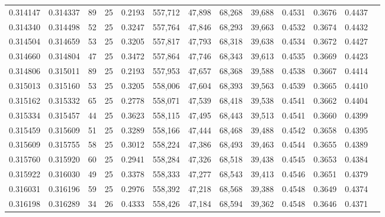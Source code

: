 \begin{tabular}{rrrrrrrrrrrrr}
0.314147 & 0.314337 &    89 &  25 &                                     0.2193 & 557,712 &  47,898 &  68,268 &  39,688 & 0.4531 & 0.3676 & 0.4437 \\
0.314340 & 0.314498 &    52 &  25 &                                     0.3247 & 557,764 &  47,846 &  68,293 &  39,663 & 0.4532 & 0.3674 & 0.4432 \\
0.314504 & 0.314659 &    53 &  25 &                                     0.3205 & 557,817 &  47,793 &  68,318 &  39,638 & 0.4534 & 0.3672 & 0.4427 \\
0.314660 & 0.314804 &    47 &  25 &                                     0.3472 & 557,864 &  47,746 &  68,343 &  39,613 & 0.4535 & 0.3669 & 0.4423 \\
0.314806 & 0.315011 &    89 &  25 &                                     0.2193 & 557,953 &  47,657 &  68,368 &  39,588 & 0.4538 & 0.3667 & 0.4414 \\
0.315013 & 0.315160 &    53 &  25 &                                     0.3205 & 558,006 &  47,604 &  68,393 &  39,563 & 0.4539 & 0.3665 & 0.4410 \\
0.315162 & 0.315332 &    65 &  25 &                                     0.2778 & 558,071 &  47,539 &  68,418 &  39,538 & 0.4541 & 0.3662 & 0.4404 \\
0.315334 & 0.315457 &    44 &  25 &                                     0.3623 & 558,115 &  47,495 &  68,443 &  39,513 & 0.4541 & 0.3660 & 0.4399 \\
0.315459 & 0.315609 &    51 &  25 &                                     0.3289 & 558,166 &  47,444 &  68,468 &  39,488 & 0.4542 & 0.3658 & 0.4395 \\
0.315609 & 0.315755 &    58 &  25 &                                     0.3012 & 558,224 &  47,386 &  68,493 &  39,463 & 0.4544 & 0.3655 & 0.4389 \\
0.315760 & 0.315920 &    60 &  25 &                                     0.2941 & 558,284 &  47,326 &  68,518 &  39,438 & 0.4545 & 0.3653 & 0.4384 \\
0.315922 & 0.316030 &    49 &  25 &                                     0.3378 & 558,333 &  47,277 &  68,543 &  39,413 & 0.4546 & 0.3651 & 0.4379 \\
0.316031 & 0.316196 &    59 &  25 &                                     0.2976 & 558,392 &  47,218 &  68,568 &  39,388 & 0.4548 & 0.3649 & 0.4374 \\
0.316198 & 0.316289 &    34 &  26 &                                     0.4333 & 558,426 &  47,184 &  68,594 &  39,362 & 0.4548 & 0.3646 & 0.4371 \\

\end{tabular}
